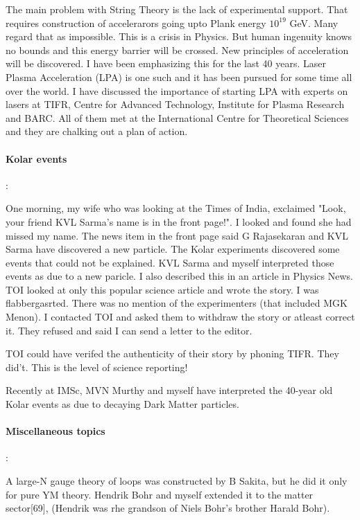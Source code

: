 The main problem with String Theory is the lack of experimental support. 
That requires construction of accelerarors going upto Plank energy $10^{19}$ 
GeV. Many regard that as impossible. This is a crisis in Physics. But 
human ingenuity knows no bounds and this energy barrier will be crossed. 
New principles of acceleration will be discovered. I have been 
emphasizing this for the last 40 years. Laser Plasma Acceleration (LPA) 
is one such and it has been pursued for some time all over the world. I 
have discussed the importance of starting LPA with experts on lasers at 
TIFR, Centre for Advanced Technology, Institute for Plasma Research and 
BARC. All of them met at the International Centre for Theoretical 
Sciences and they are chalking out a plan of action.

\paragraph{Kolar events}:

One morning, my wife who was looking at the Times of India, exclaimed 
"Look, your friend KVL Sarma's name is in the front page!". I looked and 
found she had missed my name. The news item in the front page said G 
Rajasekaran and KVL Sarma have discovered a new particle. The Kolar 
experiments discovered some events that could not be explained. KVL 
Sarma and myself interpreted those events as due to a new paricle. I 
also described this in an article in Physics News. TOI looked at only 
this popular science article and wrote the story. I was flabbergasrted. 
There was no mention of the experimenters (that included MGK Menon). I 
contacted TOI and asked them to withdraw the story or atleast correct 
it. They refused and said I can send a letter to the editor.

TOI could have verifed the authenticity of their story by phoning TIFR. 
They did't. This is the level of science reporting!

Recently at IMSc, MVN Murthy and myself have interpreted the 40-year old 
Kolar events as due to decaying Dark Matter particles.

\paragraph{Miscellaneous topics}:

A large-N gauge theory of loops was constructed by B Sakita, but he did 
it only for pure YM theory. Hendrik Bohr and myself extended it to the 
matter sector[69], (Hendrik was rhe grandson of Niels Bohr's brother 
Harald Bohr).

